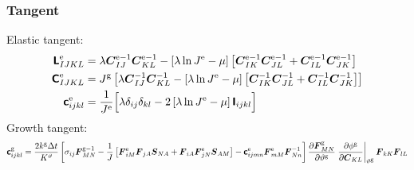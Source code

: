 \documentclass[10pt,letterpaper,oneside]{report}
\newcommand{\ten}[1]{\mbox{\boldmath $#1$}{}}
\newcommand{\tenf}[1]{\mbox{{\sffamily{\bfseries {#1}}}}}
\newcommand{\scas}[1]{\mbox{{\scriptsize{${\rm{#1}}$}}}{}}
\begin{document}
\begin{itemize}
\subsubsection{Tangent}
Elastic tangent:
\begin{align}
\tenf{L}^{\scas{e}}_{IJKL} ={}& \lambda \ten{C}^{\scas{e}-1}_{IJ} \ten{C}^{\scas{e}-1}_{KL} - \left[ \lambda \ln J^{\scas{e}} - \mu \right] \left[ \ten{C}^{\scas{e}-1}_{IK} \ten{C}^{\scas{e}-1}_{JL} + \ten{C}^{\scas{e}-1}_{IL} \ten{C}^{\scas{e}-1}_{JK} \right] 
\\
\tenf{C}^{\scas{e}}_{IJKL} ={}& J^{\scas{g}} \left[ \lambda \ten{C}^{-1}_{IJ} \ten{C}^{-1}_{KL} - \left[ \lambda \ln J^{\scas{e}} - \mu \right] \left[ \ten{C}^{-1}_{IK} \ten{C}^{-1}_{JL} + \ten{C}^{-1}_{IL} \ten{C}^{-1}_{JK} \right] \right]  
\\
\tenf{c}^{\scas{e}}_{ijkl} ={}& \frac{1}{J^{\scas{e}}} \Big[ \lambda \delta_{ij} \delta_{kl} - 2 \left[ \lambda \ln J^{\scas{e}} - \mu \right] \tenf{I}_{ijkl} \Big]
\end{align}
Growth tangent:
\begin{align}
\tenf{c}^{\scas{g}}_{ijkl} 
={}& \frac{2 k^{\scas{g}} \Delta t}{K^\vartheta} \left[ \sigma_{ij} \ten{F}^{\scas{g}-1}_{MN} 
- \frac{1}{J} \left[ \ten{F}^{\scas{e}}_{iM} \ten{F}_{jA} \ten{S}_{NA} + \ten{F}_{iA} \ten{F}^{\scas{e}}_{jN} \ten{S}_{AM} \right]
- \tenf{c}^{\scas{e}}_{ijmn} \ten{F}^{\scas{e}}_{mM} \ten{F}^{-1}_{Nn} \right] 
\frac{\partial \ten{F}^{\scas{g}}_{MN}}{\partial \vartheta^{\scas{g}}} \left. \frac{\partial \phi^{\scas{g}} }{\partial \ten{C}_{KL}} \right|_{\vartheta^{\scas{g}}} \ten{F}_{kK} \ten{F}_{lL} 
\\

\end{align}
\end{itemize}
\end{document}
